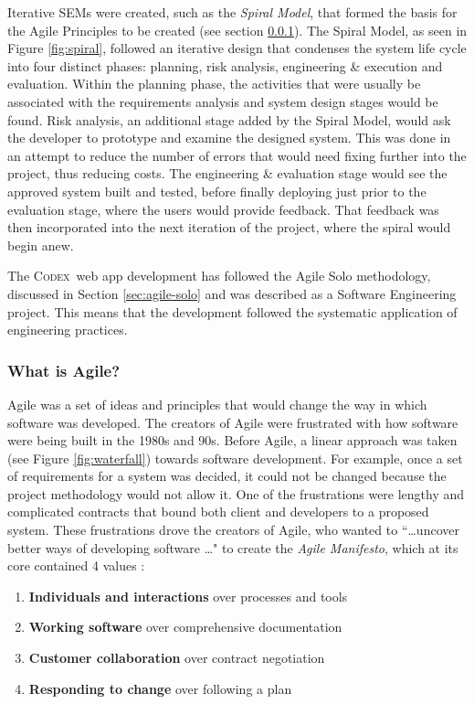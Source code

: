 \documentclass[final]{cmpreport}
\newcommand{\Codex}{\textsc{Codex}}
\begin{document}
			Iterative SEMs were created, such as the \emph{Spiral Model}, that formed the basis for the Agile Principles to be created (see section \ref{sec:what-agile}). The Spiral Model, as seen in Figure \ref{fig:spiral}, followed an iterative design that condenses the system life cycle into four distinct phases: planning, risk analysis, engineering \& execution and evaluation. Within the planning phase, the activities that were usually be associated with the requirements analysis and system design stages would be found. Risk analysis, an additional stage added by the Spiral Model, would ask the developer to prototype and examine the designed system. This was done in an attempt to reduce the number of errors that would need fixing further into the project, thus reducing costs. The engineering \& evaluation stage would see the approved system built and tested, before finally deploying just prior to the evaluation stage, where the users would provide feedback. That feedback was then incorporated into the next iteration of the project, where the spiral would begin anew.
			
			The \Codex \ web app development has followed the Agile Solo methodology, discussed in Section \ref{sec:agile-solo} and was described as a Software Engineering project. This means that the development followed the systematic application of engineering practices.
				
			\subsubsection{What is Agile?} \label{sec:what-agile}
			Agile was a set of ideas and principles that would change the way in which software was developed. The creators of Agile were frustrated with how software were being built in the 1980s and 90s. Before Agile, a linear approach was taken (see Figure \ref{fig:waterfall}) towards software development. For example, once a set of requirements for a system was decided, it could not be changed because the project methodology would not allow it. One of the frustrations were lengthy and complicated contracts that bound both client and developers to a proposed system. These frustrations drove the creators of Agile, who wanted to ``\ldots uncover better ways of developing software \ldots" to create the \textit{Agile Manifesto}, which at its core contained 4 values \citep{AgileManifesto}:
			
			\begin{enumerate}
				\item \textbf{Individuals and interactions} over processes and tools
				\item \textbf{Working software} over comprehensive documentation
				\item \textbf{Customer collaboration} over contract negotiation
				\item \textbf{Responding to change} over following a plan 
			\end{enumerate}
		
\end{document}
